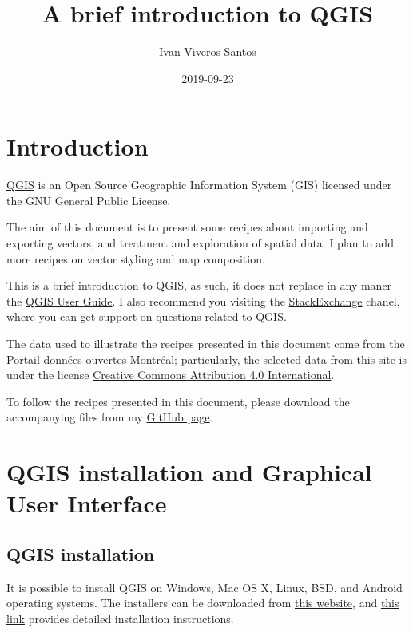 \documentclass[]{book}
\title{A brief introduction to QGIS}
\author{Ivan Viveros Santos}
\date{2019-09-23}
\theoremstyle{definition}
\theoremstyle{definition}
\theoremstyle{definition}
\theoremstyle{remark}
\begin{document}
\maketitle

{
\setcounter{tocdepth}{1}
\tableofcontents
}
\chapter{Introduction}\label{introduction}

\href{https://qgis.org/en/site/}{QGIS} is an Open Source Geographic
Information System (GIS) licensed under the GNU General Public License.

The aim of this document is to present some recipes about importing and
exporting vectors, and treatment and exploration of spatial data. I plan
to add more recipes on vector styling and map composition.

This is a brief introduction to QGIS, as such, it does not replace in
any maner the \href{https://docs.qgis.org/3.4/en/docs/user_manual/}{QGIS
User Guide}. I also recommend you visiting the
\href{https://gis.stackexchange.com/}{StackExchange} chanel, where you
can get support on questions related to QGIS.

The data used to illustrate the recipes presented in this document come
from the \href{http://donnees.ville.montreal.qc.ca/}{Portail données
ouvertes Montréal}; particularly, the selected data from this site is
under the license
\href{https://creativecommons.org/licenses/by/4.0/}{Creative Commons
Attribution 4.0 International}.

To follow the recipes presented in this document, please download the
accompanying files from my
\href{https://github.com/iviveros/QGIS_Data}{GitHub page}.

\chapter{QGIS installation and Graphical User
Interface}\label{installation}

\section{QGIS installation}\label{qgis-installation}

It is possible to install QGIS on Windows, Mac OS X, Linux, BSD, and
Android operating systems. The installers can be downloaded from
\href{https://qgis.org/en/site/forusers/download.html}{this website},
and \href{https://qgis.org/en/site/forusers/alldownloads.html\#}{this
link} provides detailed installation instructions.
\end{document}
